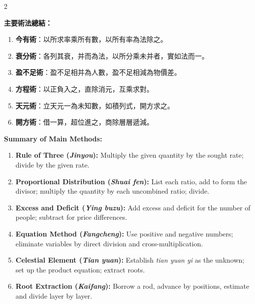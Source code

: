 \documentclass[11pt,a4paper]{article}
\begin{document}
\begin{paracol}{2}
\begin{leftcolumn}
\textbf{主要術法總結：}

\begin{enumerate}[label=\arabic*.,noitemsep]
\item \textbf{今有術}：以所求率乘所有數，以所有率為法除之。
\item \textbf{衰分術}：各列其衰，并而為法，以所分乘未并者，實如法而一。
\item \textbf{盈不足術}：盈不足相并為人數，盈不足相減為物價差。
\item \textbf{方程術}：以正負入之，直除消元，互乘求對。
\item \textbf{天元術}：立天元一為未知數，如積列式，開方求之。
\item \textbf{開方術}：借一算，超位進之，商除層層遞減。
\end{enumerate}
\end{leftcolumn}

\switchcolumn

\textbf{Summary of Main Methods:}

\begin{enumerate}[label=\arabic*.,noitemsep]
\item \textbf{Rule of Three (\textit{Jinyou}):} Multiply the given quantity by the sought rate; divide by the given rate.
\item \textbf{Proportional Distribution (\textit{Shuai fen}):} List each ratio, add to form the divisor; multiply the quantity by each uncombined ratio; divide.
\item \textbf{Excess and Deficit (\textit{Ying buzu}):} Add excess and deficit for the number of people; subtract for price differences.
\item \textbf{Equation Method (\textit{Fangcheng}):} Use positive and negative numbers; eliminate variables by direct division and cross-multiplication.
\item \textbf{Celestial Element (\textit{Tian yuan}):} Establish \textit{tian yuan yi} as the unknown; set up the product equation; extract roots.
\item \textbf{Root Extraction (\textit{Kaifang}):} Borrow a rod, advance by positions, estimate and divide layer by layer.
\end{enumerate}
\end{paracol}

\newpage

\end{document}
